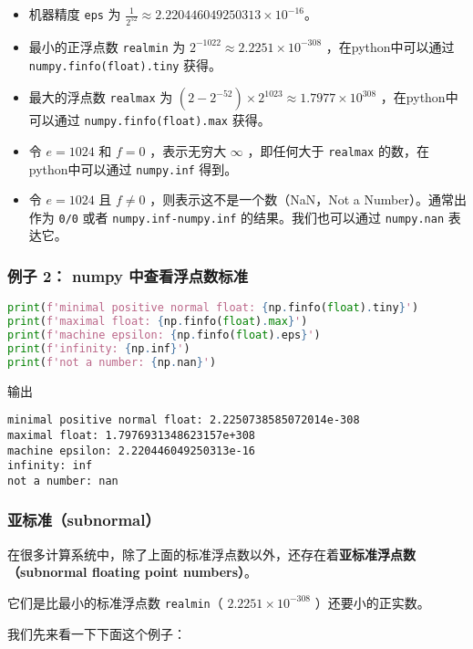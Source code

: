 \begin{itemize}
\item 机器精度 \verb|eps| 为  $\frac{1}{2^{52}}\approx 2.220446049250313\times10^{-16}$。
\item 最小的正浮点数 \verb|realmin| 为  $2^{-1022}\approx2.2251\times10^{-308}$  ，在python中可以通过 \verb|numpy.finfo(float).tiny| 获得。
\item 最大的浮点数 \verb|realmax| 为 $(2-2^{-52})\times2^{1023}\approx1.7977\times10^{308}$  ，在python中可以通过 \verb|numpy.finfo(float).max| 获得。
\item 令  $e=1024$  和  $f=0$  ，表示无穷大  $\infty$  ，即任何大于 \verb|realmax| 的数，在python中可以通过 \verb|numpy.inf| 得到。
\item 令  $e=1024$  且  $f\neq0$  ，则表示这不是一个数（NaN，Not a Number）。通常出作为 \verb|0/0| 或者 \verb|numpy.inf-numpy.inf| 的结果。我们也可以通过 \verb|numpy.nan| 表达它。
\end{itemize}

\subsubsection{例子 2： numpy 中查看浮点数标准}

\begin{lstlisting}[language=python]
print(f'minimal positive normal float: {np.finfo(float).tiny}')
print(f'maximal float: {np.finfo(float).max}')
print(f'machine epsilon: {np.finfo(float).eps}')
print(f'infinity: {np.inf}')
print(f'not a number: {np.nan}')
\end{lstlisting}

输出
\begin{lstlisting}[language={}]
minimal positive normal float: 2.2250738585072014e-308 
maximal float: 1.7976931348623157e+308 
machine epsilon: 2.220446049250313e-16 
infinity: inf 
not a number: nan
\end{lstlisting}

\subsubsection{亚标准（subnormal）}

在很多计算系统中，除了上面的标准浮点数以外，还存在着\textbf{亚标准浮点数（subnormal floating point numbers）}。 

它们是比最小的标准浮点数 \verb|realmin|（  $2.2251\times10^{-308}$  ）还要小的正实数。

我们先来看一下下面这个例子：

